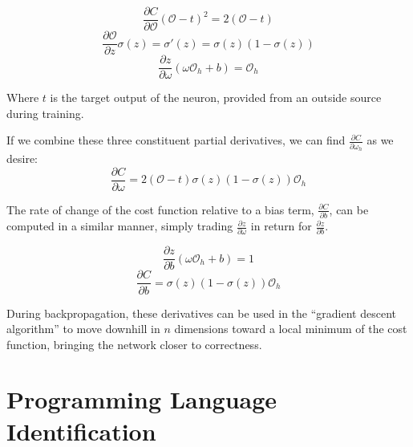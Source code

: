 \documentclass{article}
\begin{document}
$$\frac{\partial{C}}{\partial{\mathcal{O}}}(\mathcal{O}-t)^2=2(\mathcal{O}-t)$$
$$\frac{\partial{\mathcal{O}}}{\partial{z}}\sigma(z)=\sigma'(z)=\sigma(z)(1-\sigma(z))$$
$$\frac{\partial{z}}{\partial{\omega}}(\omega\mathcal{O}_h+b)=\mathcal{O}_h$$

Where $t$ is the target output of the neuron, provided from an outside source during training.

If we combine these three constituent partial derivatives, we can find $\frac{\partial{C}}{\partial{\omega_h}}$ as we desire:
$$\frac{\partial{C}}{\partial{\omega}}=2(\mathcal{O}-t)\sigma(z)(1-\sigma(z))\mathcal{O}_h$$

The rate of change of the cost function relative to a bias term, $\frac{\partial{C}}{\partial{b}}$, can be computed in a similar manner, simply trading $\frac{\partial{z}}{\partial{\omega}}$ in return for $\frac{\partial{z}}{\partial{b}}$.

$$\frac{\partial{z}}{\partial{b}}(\omega\mathcal{O}_h+b)=1$$
$$\frac{\partial{C}}{\partial{b}}=\sigma(z)(1-\sigma(z))\mathcal{O}_h$$

During backpropagation, these derivatives can be used in the ``gradient descent algorithm'' to move downhill in $n$ dimensions toward a local minimum of the cost function, bringing the network closer to correctness.

\section{Programming Language Identification}
\end{document}
